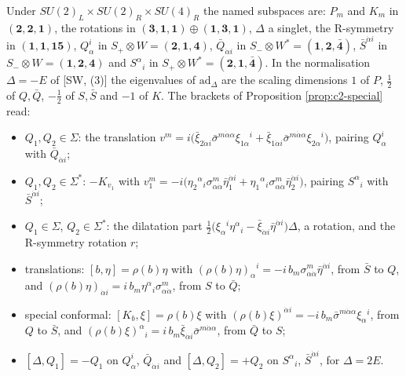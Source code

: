 \begin{remark}
Under $SU(2)_L\times SU(2)_R\times SU(4)_R$ the named subspaces are: $P_m$ and $K_m$ in $(\mathbf 2,\mathbf 2,\mathbf 1)$, the rotations in $(\mathbf 3,\mathbf 1,\mathbf 1)\oplus(\mathbf 1,\mathbf 3,\mathbf 1)$, $\Delta$ a singlet, the R-symmetry in $(\mathbf 1,\mathbf 1,\mathbf{15})$, $Q^i_\alpha$ in $S_+\otimes W=(\mathbf 2,\mathbf 1,\mathbf 4)$, $\bar Q_{\dot\alpha i}$ in $S_-\otimes W^*=(\mathbf 1,\mathbf 2,\bar{\mathbf 4})$, $\bar S^{\dot\alpha i}$ in $S_-\otimes W=(\mathbf 1,\mathbf 2,\mathbf 4)$ and $S^\alpha{}_i$ in $S_+\otimes W^*=(\mathbf 2,\mathbf 1,\bar{\mathbf 4})$. In the normalisation $\Delta=-E$ of [SW, (3)] the eigenvalues of $\mathrm{ad}_\Delta$ are the scaling dimensions $1$ of $P$, $\tfrac12$ of $Q,\bar Q$, $-\tfrac12$ of $S,\bar S$ and $-1$ of $K$. The brackets of Proposition \ref{prop:c2-special} read:
\begin{itemize}
\item $Q_1,Q_2\in\Sigma$: the translation $v^m=i\big(\bar\xi_{2\dot\alpha i}\bar\sigma^{m\dot\alpha\alpha}\xi_{1\alpha}{}^i+\bar\xi_{1\dot\alpha i}\bar\sigma^{m\dot\alpha\alpha}\xi_{2\alpha}{}^i\big)$, pairing $Q^i_\alpha$ with $\bar Q_{\dot\alpha i}$;
\item $Q_1,Q_2\in\Sigma^*$: $-K_{v_1}$ with $v_1^m=-i\big(\eta_2{}^\alpha{}_i\sigma^m_{\alpha\dot\alpha}\bar\eta_1^{\dot\alpha i}+\eta_1{}^\alpha{}_i\sigma^m_{\alpha\dot\alpha}\bar\eta_2^{\dot\alpha i}\big)$, pairing $S^\alpha{}_i$ with $\bar S^{\dot\alpha i}$;
\item $Q_1\in\Sigma$, $Q_2\in\Sigma^*$: the dilatation part $\tfrac12\big(\xi_\alpha{}^i\eta^\alpha{}_i-\bar\xi_{\dot\alpha i}\bar\eta^{\dot\alpha i}\big)\Delta$, a rotation, and the R-symmetry rotation $r$;
\item translations: $[b,\eta]=\rho(b)\eta$ with $(\rho(b)\eta)_\alpha{}^i=-i\,b_m\sigma^m_{\alpha\dot\alpha}\bar\eta^{\dot\alpha i}$, from $\bar S$ to $Q$, and $(\rho(b)\eta)_{\dot\alpha i}=i\,b_m\eta^\alpha{}_i\sigma^m_{\alpha\dot\alpha}$, from $S$ to $\bar Q$;
\item special conformal: $[K_b,\xi]=\rho(b)\xi$ with $(\rho(b)\xi)^{\dot\alpha i}=-i\,b_m\bar\sigma^{m\dot\alpha\alpha}\xi_\alpha{}^i$, from $Q$ to $\bar S$, and $(\rho(b)\xi)^\alpha{}_i=i\,b_m\bar\xi_{\dot\alpha i}\bar\sigma^{m\dot\alpha\alpha}$, from $\bar Q$ to $S$;
\item $[\Delta,Q_1]=-Q_1$ on $Q^i_\alpha$, $\bar Q_{\dot\alpha i}$ and $[\Delta,Q_2]=+Q_2$ on $S^\alpha{}_i$, $\bar S^{\dot\alpha i}$, for $\Delta=2E$.
\end{itemize}
\end{remark}


